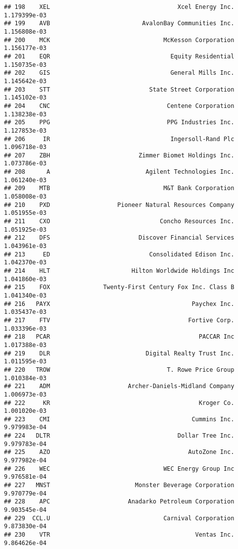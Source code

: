\documentclass[
]{article}
\begin{document}
\begin{verbatim}
## 198    XEL                                    Xcel Energy Inc. 1.179399e-03
## 199    AVB                          AvalonBay Communities Inc. 1.156808e-03
## 200    MCK                                McKesson Corporation 1.156177e-03
## 201    EQR                                  Equity Residential 1.150735e-03
## 202    GIS                                  General Mills Inc. 1.145642e-03
## 203    STT                            State Street Corporation 1.145102e-03
## 204    CNC                                 Centene Corporation 1.138238e-03
## 205    PPG                                 PPG Industries Inc. 1.127853e-03
## 206     IR                                  Ingersoll-Rand Plc 1.096718e-03
## 207    ZBH                         Zimmer Biomet Holdings Inc. 1.073786e-03
## 208      A                           Agilent Technologies Inc. 1.061240e-03
## 209    MTB                                M&T Bank Corporation 1.058008e-03
## 210    PXD                   Pioneer Natural Resources Company 1.051955e-03
## 211    CXO                               Concho Resources Inc. 1.051925e-03
## 212    DFS                         Discover Financial Services 1.043961e-03
## 213     ED                            Consolidated Edison Inc. 1.042370e-03
## 214    HLT                       Hilton Worldwide Holdings Inc 1.041860e-03
## 215    FOX               Twenty-First Century Fox Inc. Class B 1.041340e-03
## 216   PAYX                                        Paychex Inc. 1.035437e-03
## 217    FTV                                       Fortive Corp. 1.033396e-03
## 218   PCAR                                          PACCAR Inc 1.017388e-03
## 219    DLR                           Digital Realty Trust Inc. 1.011595e-03
## 220   TROW                                 T. Rowe Price Group 1.010384e-03
## 221    ADM                      Archer-Daniels-Midland Company 1.006973e-03
## 222     KR                                          Kroger Co. 1.001020e-03
## 223    CMI                                        Cummins Inc. 9.979983e-04
## 224   DLTR                                    Dollar Tree Inc. 9.979783e-04
## 225    AZO                                       AutoZone Inc. 9.977982e-04
## 226    WEC                                WEC Energy Group Inc 9.976581e-04
## 227   MNST                        Monster Beverage Corporation 9.970779e-04
## 228    APC                      Anadarko Petroleum Corporation 9.903545e-04
## 229  CCL.U                                Carnival Corporation 9.873830e-04
## 230    VTR                                         Ventas Inc. 9.864626e-04

\end{verbatim}
\end{document}
